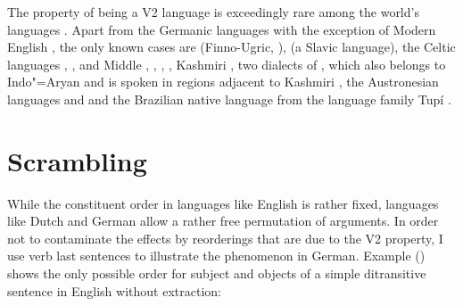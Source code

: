 The property of being a V2 language is exceedingly rare among the world's languages \citep[]{Holmberg2015a}. Apart from the Germanic languages with the exception of 
Modern English \citep{HP86a-ed}, the only known cases are  (Finno-Ugric, \citealp[]{Holmberg2015a}),  \citep[entry~79]{Plank2003b-ed} (a Slavic language), the
Celtic languages  \citep{BK2000a-u},  \citep*[]{BTW2007a-u}, and Middle  \citep{Willis1998a-u},  \parencites[Section~1.3]{Adams1987a-u}[Section~2.1.2]{Roberts93a-u}[Chapter~2]{Vance97a-u}, 
\citep[Section~3.3.2]{Fontana97a-u}, 
 \citep{Poletto2002a-u,Anderson2006a-u}, Kashmiri
\citep[Chapter~4]{Bhatt99a-u}, two dialects of , which also belongs to Indo"=Aryan
and is spoken in regions adjacent to Kashmiri \citep{Hendriksen90a}, the Austronesian
languages  and  \citep[]{Ross2004a-u} and the Brazilian native
language  from the language family Tupí \citep{Storto2003a-u}.



\section{Scrambling}
\label{sec-phenomenon-scrambling}

While the constituent order in languages like English is rather fixed, languages like Dutch and
German allow a rather free permutation of arguments. In order not to contaminate the effects by
reorderings that are due to the V2 property, I use verb last sentences to illustrate the
phenomenon in German. Example () shows the only possible order for subject and objects of a simple
ditransitive sentence in English without extraction:


